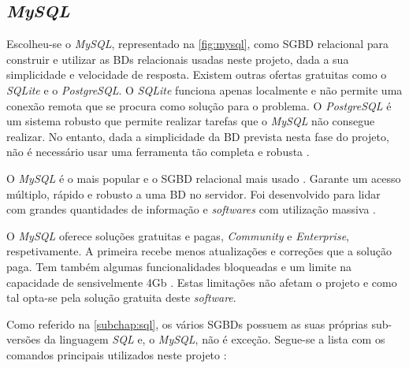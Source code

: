 \documentclass[11pt,twoside,a4paper]{report}
\begin{document}
\subsection{\textit{MySQL}}
\label{subchap:mysql}
Escolheu-se o \textit{MySQL}, representado na \autoref{fig:mysql}, como SGBD relacional para construir e utilizar as BDs relacionais usadas neste projeto, dada a sua simplicidade e velocidade de resposta. Existem outras ofertas gratuitas como o \textit{SQLite} e o \textit{PostgreSQL}. O \textit{SQLite} funciona apenas localmente e não permite uma conexão remota que se procura como solução para o problema. O \textit{PostgreSQL} é um sistema robusto que permite realizar tarefas que o \textit{MySQL} não consegue realizar. No entanto, dada a simplicidade da BD prevista nesta fase do projeto, não é necessário usar uma ferramenta tão completa e robusta \cite{mysqlvs}.\par 
O \textit{MySQL} é o mais popular e o SGBD relacional mais usado \cite{mysqlvs}. Garante um acesso múltiplo, rápido e robusto a uma BD no servidor. Foi desenvolvido para lidar com grandes quantidades de informação e \textit{softwares} com utilização massiva \cite{mysql}.\par 
O \textit{MySQL} oferece soluções gratuitas e pagas, \textit{Community} e \textit{Enterprise}, respetivamente. A primeira recebe menos atualizações e correções que a solução paga. Tem também algumas funcionalidades bloqueadas e um limite na capacidade de sensivelmente 4Gb \cite{mysql}. Estas limitações não afetam o projeto e como tal opta-se pela solução gratuita deste \textit{software}.\par
Como referido na \autoref{subchap:sql}, os vários SGBDs possuem as suas próprias sub-versões da linguagem \textit{SQL} e, o \textit{MySQL}, não é exceção. Segue-se a lista com os comandos principais utilizados neste projeto \cite{mysql}:
\end{document}
